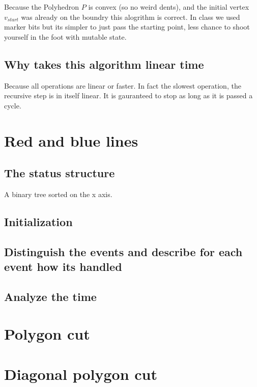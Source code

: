 \documentclass{article}
\begin{document}
Because the Polyhedron $P$ is convex (so no weird dents), and
the initial vertex $v_{start}$ was already on the boundry this
alogrithm is correct.
In class we used marker bits but its simpler to just pass the
starting point, less chance to shoot yourself in the foot with
mutable state.

\subsection{Why takes this algorithm linear time}
Because all operations are linear or faster. In fact the slowest
operation, the recursive step is in itself linear. It is gauranteed to stop
as long as it is passed a cycle.

\section{Red and blue lines}
\subsection{The status structure}
A binary tree sorted on the x axis.
\subsection{Initialization}

\subsection{Distinguish the events and describe for each event how its handled}
\subsection{Analyze the time}

\section{Polygon cut}
\section{Diagonal polygon cut}
\end{document}

